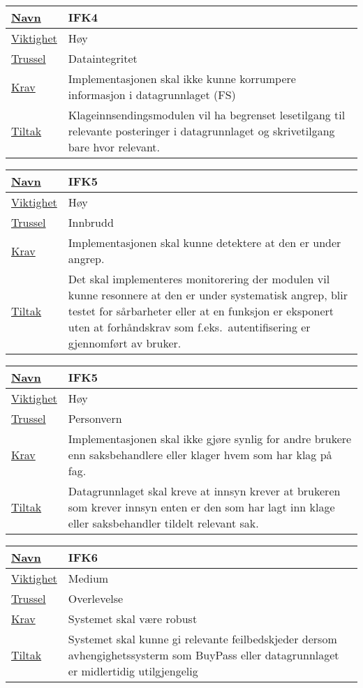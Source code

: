 \begin{tabularx}{\textwidth}{|l|X|}
  \hline
  \underline{Navn} & IFK4 \\ \hline
  \underline{Viktighet} & Høy \\ \hline
  \underline{Trussel} & Dataintegritet \\ \hline
  \underline{Krav} & Implementasjonen skal ikke kunne korrumpere informasjon i datagrunnlaget (FS) \\ \hline
  \underline{Tiltak} & Klageinnsendingsmodulen vil ha begrenset lesetilgang til relevante posteringer i datagrunnlaget og skrivetilgang bare hvor relevant. \\ \hline
\end{tabularx}

\vfill

\begin{tabularx}{\textwidth}{|l|X|}
  \hline
  \underline{Navn} & IFK5 \\ \hline
  \underline{Viktighet} & Høy \\ \hline
  \underline{Trussel} & Innbrudd \\ \hline
  \underline{Krav} & Implementasjonen skal kunne detektere at den er under angrep. \\ \hline
  \underline{Tiltak} & Det skal implementeres monitorering der modulen vil kunne resonnere at den er under systematisk angrep, blir testet for sårbarheter eller at en funksjon er
  eksponert uten at forhåndskrav som f.eks.\ autentifisering er gjennomført av bruker. \\ \hline
\end{tabularx}

\vfill

\begin{tabularx}{\textwidth}{|l|X|}
  \hline
  \underline{Navn} & IFK5 \\ \hline
  \underline{Viktighet} & Høy \\ \hline
  \underline{Trussel} & Personvern \\ \hline
  \underline{Krav} & Implementasjonen skal ikke gjøre synlig for andre brukere enn saksbehandlere eller klager hvem som har klag på fag. \\ \hline
  \underline{Tiltak} & Datagrunnlaget skal kreve at innsyn krever at brukeren som krever innsyn enten er den som har lagt inn klage eller saksbehandler tildelt relevant sak. \\ \hline
\end{tabularx}

\vfill

\begin{tabularx}{\textwidth}{|l|X|}
  \hline
  \underline{Navn} & IFK6 \\ \hline
  \underline{Viktighet} & Medium \\ \hline
  \underline{Trussel} & Overlevelse \\ \hline
  \underline{Krav} & Systemet skal være robust \\ \hline
  \underline{Tiltak} & Systemet skal kunne gi relevante feilbedskjeder dersom avhengighetssysterm som BuyPass eller datagrunnlaget er midlertidig utilgjengelig \\ \hline 
\end{tabularx}

